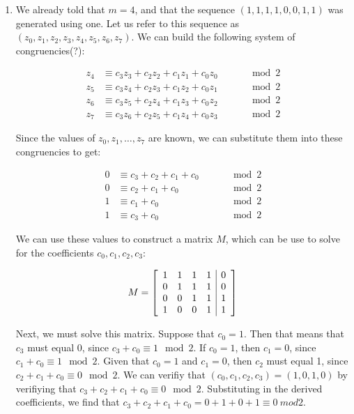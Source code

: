 \documentclass[11pt]{article}
\theoremstyle{definition}
\begin{document}
\begin{enumerate}
\begin{enumerate}
\item We already told that $m = 4$, and that the sequence $(1, 1, 1, 1, 0, 0, 1, 1)$ was generated using one. Let us refer to this sequence as $(z_0, z_1, z_2, z_3, z_4, z_5, z_6, z_7)$. We can build the following system of congruencies(?):

\begin{align*}
z_4 &\equiv c_3  z_3 + c_2  z_2 + c_1  z_1 + c_0  z_0 \qquad &\mod{2}\\
z_5 &\equiv c_3  z_4 + c_2  z_3 + c_1  z_2 + c_0  z_1 \qquad &\mod{2}\\
z_6 &\equiv c_3  z_5 + c_2  z_4 + c_1  z_3 + c_0  z_2 \qquad &\mod{2}\\
z_7 &\equiv c_3  z_6 + c_2  z_5 + c_1  z_4 + c_0  z_3 \qquad &\mod{2}
\end{align*}

Since the values of $z_0, z_1, \ldots , z_7$ are known, we can substitute them into these congruencies to get:

\begin{align*}
0 &\equiv c_3 + c_2 + c_1 + c_0 \qquad &\mod{2}\\
0 &\equiv c_2 + c_1 + c_0 \qquad &\mod{2}\\
1 &\equiv c_1 + c_0 \qquad &\mod{2}\\
1 &\equiv c_3 + c_0 \qquad &\mod{2}
\end{align*}

We can use these values to construct a matrix $M$, which can be use to solve for the coefficients $c_0, c_1, c_2, c_3$:

\[
  M=
  \left[ {\begin{array}{cccc | c}
   1 & 1 & 1 & 1 & 0\\
   0 & 1 & 1 & 1 & 0\\
   0 & 0 & 1 & 1 & 1\\
   1 & 0 & 0 & 1 & 1\\
  \end{array} } \right]
\]

Next, we must solve this matrix. Suppose that $c_0 = 1$. Then that means that $c_3$ must equal 0, since $c_3 + c_0 \equiv 1 \mod{2}$. If $c_0 = 1$, then $c_1 = 0$, since $c_1 + c_0 \equiv 1 \mod{2}$. Given that $c_0 = 1$ and $c_1 = 0$, then $c_2$ must equal 1,
since $c_2 + c_1 + c_0 \equiv 0 \mod{2}$. We can verifiy that $(c_0, c_1, c_2, c_3) = (1, 0, 1, 0)$ by verifiying that $c_3 + c_2 + c_1 + c_0 \equiv 0 \mod{2}$. Substituting in the derived coefficients, we find that $c_3 + c_2 + c_1 + c_0 = 0 + 1 + 0 + 1 \equiv 0 \ mod{2}$.


\end{enumerate}
\end{enumerate}
\end{document}

